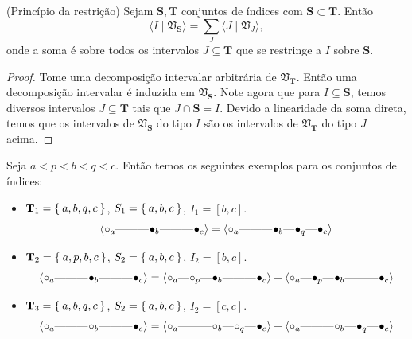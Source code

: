 \begin{propo}{(Princípio da restrição)}\label{teo:restr_princ}
    Sejam $\mathbf{S}, \mathbf{T}$ conjuntos de índices com $\mathbf{S} \subset \mathbf{T}$. Então
    \begin{equation*}
        \langle I \mid \mathfrak{V}_{\mathbf{S}} \rangle = 
        \sum_{J} \langle J \mid \mathfrak{V}_{J} \rangle,
    \end{equation*}
    onde a soma é sobre todos os intervalos $J \subseteq \mathbf{T}$ que se restringe a 
    $I$ sobre $\mathbf{S}$. 
\end{propo}
\begin{proof}   
    Tome uma decomposição intervalar arbitrária de $\mathfrak{V}_{\mathbf{T}}$. Então uma decomposição
    intervalar é induzida em $\mathfrak{V}_{\mathbf{S}}$. Note agora que para $I \subseteq \mathbf{S}$,
    temos diversos intervalos $J \subseteq \mathbf{T}$ tais que $J \cap \mathbf{S} = I$. Devido a 
    linearidade da soma direta, temos que os intervalos de $\mathfrak{V}_{\mathbf{S}}$ do tipo $I$ 
    são os intervalos de $\mathfrak{V}_{\mathbf{T}}$ do tipo $J$ acima. 
\end{proof}
\begin{ex}
    Seja $a < p < b < q < c$. Então temos os seguintes exemplos para os conjuntos de índices:
    \begin{itemize}
        \item $\mathbf{T}_1 = \Set{a,b,q,c}$, $S_1=\Set{a,b,c}$, $I_1=[b,c]$.
        \begin{equation*}
            \innerproduct{\qoff{a} \qem \qno \qem \qon{b} \qem \qno \qem \qon{c}} =
            \innerproduct{\qoff{a} \qem \qno \qem \qon{b} \qem \qon{q} \qem \qon{c}} 
        \end{equation*}
        \item $\mathbf{T}_2 = \Set{a,p,b,c}$, $S_2=\Set{a,b,c}$, $I_2=[b,c]$.
        \begin{equation*}
            \innerproduct{\qoff{a} \qem \qno \qem \qon{b} \qem \qno \qem \qon{c}} =
            \innerproduct{\qoff{a} \qem \qoff{p} \qem \qon{b} \qem \qno \qem \qon{c}}
            + \innerproduct{\qoff{a} \qem \qon{p} \qem \qon{b} \qem \qno \qem \qon{c}} 
        \end{equation*}
        \item $\mathbf{T}_3 = \Set{a,b,q,c}$, $S_2=\Set{a,b,c}$, $I_2=[c,c]$.
        \begin{equation*}
            \innerproduct{\qoff{a} \qem \qno \qem \qoff{b} \qem \qno \qem \qon{c}} =
            \innerproduct{\qoff{a} \qem \qno \qem \qoff{b} \qem \qoff{q} \qem \qon{c}}
            + \innerproduct{\qoff{a} \qem \qno \qem \qoff{b} \qem \qon{q} \qem \qon{c}} 
        \end{equation*}
         
    \end{itemize}
\end{ex}

